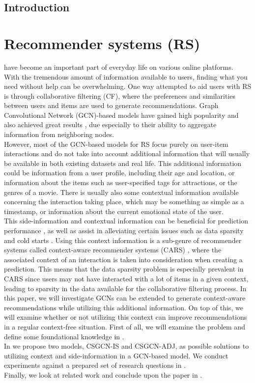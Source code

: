 \noindent
\section{Introduction}
\chapter{Recommender systems (RS)}\label{ch:introduction}
have become an important part of everyday life on various online platforms.
\\
With the tremendous amount of information available to users, finding what you need without help can be overwhelming.
One way attempted to aid users with RS is through collaborative filtering (CF), where the preferences and similarities between users and items are used to generate recommendations. 
Graph Convolutional Network (GCN)-based models have gained high popularity and also achieved great results \cite{NGCF,LightGCN,KGAT}, due especially to their ability to aggregate information from neighboring nodes.\\
However, most of the GCN-based models for RS focus purely on user-item interactions and do not take into account additional information that will usually be available in both existing datasets and real life.
This additional information could be information from a user profile, including their age and location, or information about the items such as user-specified tags for attractions, or the genres of a movie.
There is usually also some contextual information available concerning the interaction taking place, which may be something as simple as a timestamp, or information about the current emotional state of the user.\\
This side-information and contextual information can be beneficial for prediction performance \cite{ContextImportance2}, as well as assist in alleviating certain issues such as data sparsity and cold starts \cite{SideInfoDefinition}.
Using this context information is a sub-genre of recommender systems called context-aware recommender systems (CARS) \cite{carsprogress}, where the associated context of an interaction is taken into consideration when creating a prediction.
This means that the data sparsity problem is especially prevalent in CARS since users may not have interacted with a lot of items in a given context, leading to sparsity in the data available for the collaborative filtering process.
In this paper, we will investigate GCNs can be extended to generate context-aware recommendations while utilizing this additional information.
On top of this, we will examine whether or not utilizing this context can improve recommendations in a regular context-free situation.
First of all, we will examine the problem and define some foundational knowledge in .\\
In  we propose two models, CSGCN-IS and CSGCN-ADJ, as possible solutions to utilizing context and side-information in a GCN-based model.
We conduct experiments against a prepared set of research questions in .\\
Finally, we look at related work and conclude upon the paper in .
\\\\
